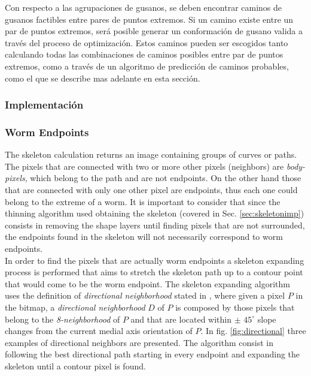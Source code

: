 Con respecto a las agrupaciones de gusanos, se deben encontrar caminos de gusanos factibles entre
pares de puntos extremos. Si un camino existe entre un par de puntos extremos, ser\'a posible
generar un conformaci\'on de gusano valida a trav\'es del proceso de optimizaci\'on. 
Estos caminos pueden ser escogidos tanto calculando todas las combinaciones de caminos posibles
entre par de puntos extremos, como a trav\'es de un algoritmo de predicci\'on de caminos probables,
como el que se describe mas adelante en esta secci\'on.

\subsubsection{Implementaci\'on}

\subsubsection*{Worm Endpoints}
\label{sec:wend}
The skeleton calculation returns an image 
containing groups of curves or paths.
The pixels that are connected with 
two or more other pixels (neighbors) are \emph{body-pixels}, which belong 
to the path and are not endpoints. On the other hand those that are connected with 
only one other pixel are endpoints, thus each one could belong to the extreme of a
worm. It is important to consider that since the thinning algorithm used obtaining the skeleton (covered in Sec. \ref{sec:skeletonimp}) consists in removing the shape
layers until finding pixels that are not surrounded, the endpoints found in the
skeleton will not necessarily correspond to worm endpoints.\\

In order to find the pixels that are actually worm endpoints a skeleton expanding process
is performed that aims to stretch the skeleton path up to a contour point that 
would come to be the worm endpoint. The skeleton expanding algorithm uses the definition
of \emph{directional neighborhood} stated in \cite[p.334]{maxima}, where given 
a pixel $P$ in the bitmap, a \emph{directional neighborhood} $D$ of $P$ is 
composed by those pixels that belong to the \emph{8-neighborhood} of $P$ and that
are located within $\pm$ $45^{\circ}$ slope changes from the current medial axis 
orientation of $P$. In fig. \ref{fig:directional} three examples of directional
neighbors are presented. The algorithm consist in following the best directional path
starting in every endpoint and expanding the skeleton until a contour pixel is found.
 
